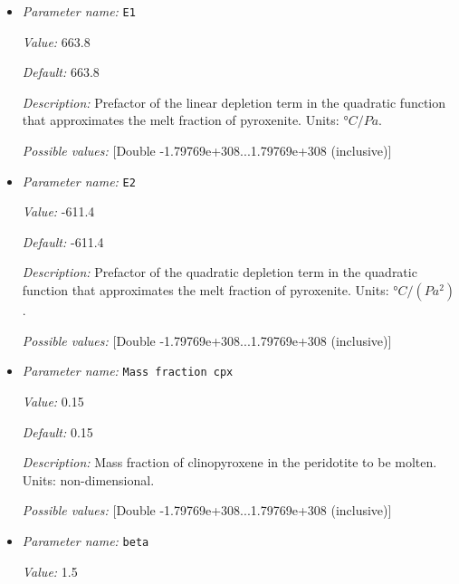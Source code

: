 \begin{itemize}
{\it Description:} Prefactor of the quadratic pressure term in the quadratic function that approximates the solidus of pyroxenite. Units: $°C/(Pa^2)$.


{\it Possible values:} [Double -1.79769e+308...1.79769e+308 (inclusive)]
\item {\it Parameter name:} {\tt E1}
\label{parameters:Postprocess/Visualization/Melt fraction/E1}


{\it Value:} 663.8


{\it Default:} 663.8


{\it Description:} Prefactor of the linear depletion term in the quadratic function that approximates the melt fraction of pyroxenite. Units: $°C/Pa$.


{\it Possible values:} [Double -1.79769e+308...1.79769e+308 (inclusive)]
\item {\it Parameter name:} {\tt E2}
\label{parameters:Postprocess/Visualization/Melt fraction/E2}


{\it Value:} -611.4


{\it Default:} -611.4


{\it Description:} Prefactor of the quadratic depletion term in the quadratic function that approximates the melt fraction of pyroxenite. Units: $°C/(Pa^2)$.


{\it Possible values:} [Double -1.79769e+308...1.79769e+308 (inclusive)]
\item {\it Parameter name:} {\tt Mass fraction cpx}
\label{parameters:Postprocess/Visualization/Melt fraction/Mass fraction cpx}


{\it Value:} 0.15


{\it Default:} 0.15


{\it Description:} Mass fraction of clinopyroxene in the peridotite to be molten. Units: non-dimensional.


{\it Possible values:} [Double -1.79769e+308...1.79769e+308 (inclusive)]
\item {\it Parameter name:} {\tt beta}
\label{parameters:Postprocess/Visualization/Melt fraction/beta}


{\it Value:} 1.5



\end{itemize}
